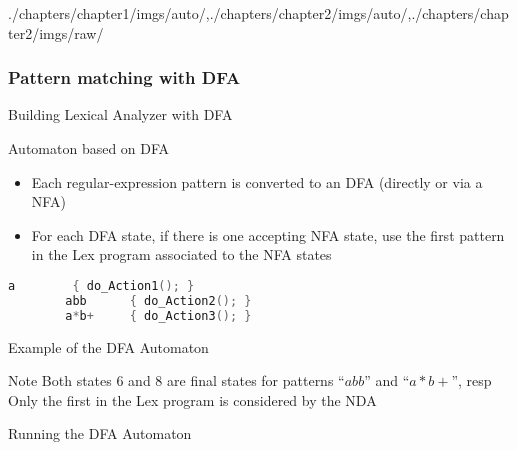 \begin{graphicspathcontext}{{./chapters/chapter1/imgs/auto/},{./chapters/chapter2/imgs/auto/},{./chapters/chapter2/imgs/raw/}}
\begin{bibunit}[apalike]
\subsubsection{Pattern matching with DFA}
\subsubsectiontableofcontentslide

\begin{frame}[fragile]{{Building Lexical Analyzer} with DFA}
	\begin{block}{Automaton based on DFA}
		\begin{itemize}
		\item Each regular-expression pattern is converted to an DFA (directly or via a NFA)
		\item For each DFA state, if there is one accepting NFA state, use the first pattern in the Lex program associated to the NFA states
		\end{itemize}
	\end{block}
	\vspace{1cm}
	\begin{example}
		\begin{lstlisting}[language=C,basicstyle={\normalsize}]
		a        { do_Action1(); }
		abb      { do_Action2(); }
		a*b+     { do_Action3(); }
		\end{lstlisting}
	\end{example}
\end{frame}

\begin{frame}{Example of the DFA Automaton}
	\centering{} \\[.25cm]
	\begin{block}{\small Note}\small
	Both states $6$ and $8$ are final states for patterns ``$abb$'' and ``$a*b+$'', resp \\
	Only the first in the Lex program is considered by the NDA
	\end{block}
\end{frame}

\begin{frame}{Running the DFA Automaton}
	\begin{leftarrowsequence}
	\end{leftarrowsequence}
\end{frame}


\end{bibunit}
\end{graphicspathcontext}

